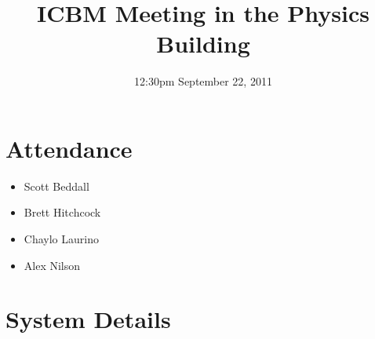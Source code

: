 \documentclass{article}
\begin{document}
\title{ICBM Meeting in the Physics Building}
\date{12:30pm September 22, 2011}
\maketitle

\section{Attendance}
\begin{itemize}
\item Scott Beddall
\item Brett Hitchcock
\item Chaylo Laurino
\item Alex Nilson
\end{itemize}

\section{System Details}
\end{document}
